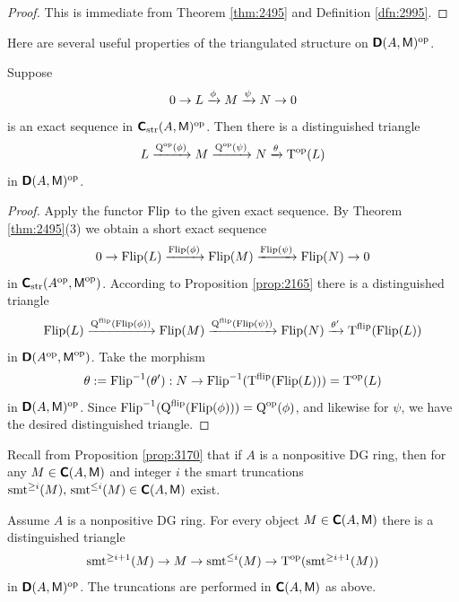 \begin{proof}
This is immediate from Theorem \ref{thm:2495} and Definition \ref{dfn:2995}.
\end{proof}

Here are several useful properties of the triangulated structure on 
$\boldsymbol{\mathsf{D}}(A, \operatorname{\mathsf{M}})^{\mathrm{op}}$.

\begin{prop} \label{prop:3060}
Suppose 
\[ 0 \to L \xrightarrow{\phi} M \xrightarrow{\psi} N \to 0 \]
is an exact sequence in 
$\boldsymbol{\mathsf{C}}_{\mathrm{str}}(A, \operatorname{\mathsf{M}})^{\mathrm{op}}$. 
Then there is a distinguished triangle 
\[ L \xrightarrow{\operatorname{Q}^{\mathrm{op}}(\phi)} 
M \xrightarrow{\operatorname{Q}^{\mathrm{op}}(\psi)} 
N \xrightarrow{\theta} \operatorname{T}^{\mathrm{op}}(L) \]
in $\boldsymbol{\mathsf{D}}(A, \operatorname{\mathsf{M}})^{\mathrm{op}}$.
\end{prop}

\begin{proof}
Apply the functor $\operatorname{Flip}$ to the given exact sequence. By Theorem 
\ref{thm:2495}(3) we obtain a short exact sequence 
\[ 0 \to \operatorname{Flip}(L) \xrightarrow{\operatorname{Flip}(\phi)} \operatorname{Flip}(M) 
\xrightarrow{\operatorname{Flip}(\psi)} \operatorname{Flip}(N) \to 0 \]
in 
$\boldsymbol{\mathsf{C}}_{\mathrm{str}}(A^{\mathrm{op}}, \operatorname{\mathsf{M}}^{\mathrm{op}})$. 
According to Proposition \ref{prop:2165} there is a  distinguished triangle
\[ \operatorname{Flip}(L) \xrightarrow{\operatorname{Q}^{\mathrm{flip}}(\operatorname{Flip}(\phi))}
\operatorname{Flip}(M) \xrightarrow{\operatorname{Q}^{\mathrm{flip}}(\operatorname{Flip}(\psi))}
\operatorname{Flip}(N) \xrightarrow{\theta'}
\operatorname{T}^{\mathrm{flip}}(\operatorname{Flip}(L)) \]
in 
$\boldsymbol{\mathsf{D}}(A^{\mathrm{op}}, \operatorname{\mathsf{M}}^{\mathrm{op}})$.
Take the morphism 
\[ \theta := \operatorname{Flip}^{-1}(\theta') : N \to 
\operatorname{Flip}^{-1}(\operatorname{T}^{\mathrm{flip}}(\operatorname{Flip}(L))) = 
\operatorname{T}^{\mathrm{op}}(L) \]
in $\boldsymbol{\mathsf{D}}(A, \operatorname{\mathsf{M}})^{\mathrm{op}}$.
Since 
$\operatorname{Flip}^{-1}(\operatorname{Q}^{\mathrm{flip}}(\operatorname{Flip}(\phi))) = 
\operatorname{Q}^{\mathrm{op}}(\phi)$,
and likewise for $\psi$, we have the desired distinguished triangle. 
\end{proof}

Recall from Proposition \ref{prop:3170}
that if $A$ is a nonpositive DG ring, then for any 
$M \in \boldsymbol{\mathsf{C}}(A, \operatorname{\mathsf{M}})$ and integer $i$ the smart truncations 
$\operatorname{smt}^{\geq i}(M), \, \operatorname{smt}^{\leq i}(M) \in \boldsymbol{\mathsf{C}}(A, \operatorname{\mathsf{M}})$
exist. 

\begin{prop} \label{prop:3061}
Assume $A$ is a nonpositive DG ring. 
For every object $M \in \boldsymbol{\mathsf{C}}(A, \operatorname{\mathsf{M}})$
there is a distinguished triangle 
\[ \operatorname{smt}^{\geq i + 1}(M) \to M \to 
\operatorname{smt}^{\leq i}(M) \to 
\operatorname{T}^{\mathrm{op}}(\operatorname{smt}^{\geq i + 1}(M)) \]
in $\boldsymbol{\mathsf{D}}(A, \operatorname{\mathsf{M}})^{\mathrm{op}}$. The truncations are performed in 
$\boldsymbol{\mathsf{C}}(A, \operatorname{\mathsf{M}})$ as above. 
\end{prop}

